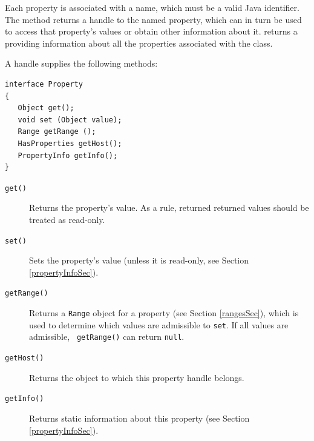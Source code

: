 \documentclass{article}
\begin{document}
Each property is associated with a name, which must be a valid Java
identifier. The
 method returns
a  handle to the named property, 
which can in turn be
used to access that property's values or obtain other information
about it. 
returns a 
providing information about all the properties associated with the
class.

A  handle supplies the following methods:
\begin{lstlisting}[]
interface Property
{
   Object get(); 
   void set (Object value); 
   Range getRange ();
   HasProperties getHost();
   PropertyInfo getInfo();
}
\end{lstlisting}

\begin{description}

\item[{\tt get()} ] \mbox{}

Returns the property's value. As a rule, returned 
returned values should be treated as read-only.

\item[{\tt set()} ] \mbox{}

Sets the property's value (unless it is read-only, see Section
\ref{propertyInfoSec}).

\item[{\tt getRange()} ] \mbox{}

Returns a {\tt Range} object for a property
(see Section \ref{rangesSec}), which is used to determine which values
are admissible to {\tt set}.  If all values are admissible, {\tt
getRange()} can return {\tt null}.

\item[{\tt getHost()} ] \mbox{}

Returns the object to which this property handle belongs.

\item[{\tt getInfo()} ] \mbox{}

Returns static information about this property (see Section
\ref{propertyInfoSec}).

\end{description}
\end{document}
